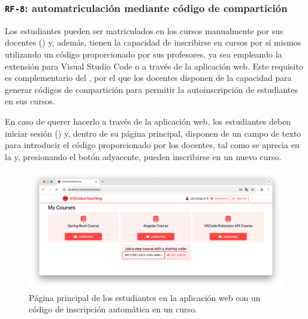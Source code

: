 \subsubsection{\texttt{RF-8}: automatriculación mediante código de compartición}
\label{subsec:rf8}

Los estudiantes pueden ser matriculados en los cursos manualmente por sus docentes () y, además, tienen la capacidad de inscribirse en cursos por sí mismos utilizando un código proporcionado por sus profesores, ya sea empleando la extensión para Visual Studio Code o a través de la aplicación web. Este requisito es complementario del , por el que los docentes disponen de la capacidad para generar códigos de compartición para permitir la autoinscripción de estudiantes en sus cursos.

En caso de querer hacerlo a través de la aplicación web, los estudiantes deben iniciar sesión () y, dentro de su página principal, disponen de un campo de texto para introducir el código proporcionado por los docentes, tal como se aprecia en la  y, presionando el botón adyacente, pueden inscribirse en un nuevo curso.

\begin{figure}[ht]
    \centering
    \includegraphics[width=\textwidth]{imagenes/utilizadas/4-3-implementacion/rf8-1.png}
    \caption{Página principal de los estudiantes en la aplicación web con un código de inscripción automática en un curso.}
    \label{fig:reqf8-1}
\end{figure}
